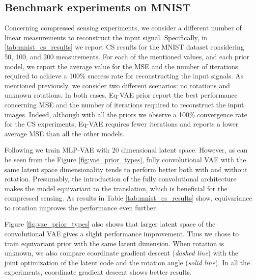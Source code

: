 \subsection{Benchmark experiments on MNIST}
Concerning compressed sensing experiments, we consider a different number of linear measurements to reconstruct the input signal. Specifically, in \autoref{tab:mnist_cs_results} we report CS results for the MNIST dataset considering 50, 100, and 200 measurements. For each of the mentioned values, and each prior model, we report the average value for the MSE and the number of iterations required to achieve a 100\% success rate for reconstructing the input signals.
As mentioned previously, we consider two different scenarios: no rotations and unknown rotations. In both cases, Eq-VAE prior report the best performance concerning MSE and the number of iterations required to reconstruct the input images.
Indeed, although with all the priors we observe a 100\% convergence rate for the CS experiments, Eq-VAE requires fewer iterations and reports a lower average MSE than all the other models.

Following \cite{Bora2017-as} we train MLP-VAE with 20 dimensional latent space. However, as can be seen from the Figure \ref{fig:vae_prior_types}, fully convolutional VAE with the same latent space dimensionality tends to perform better both with and without rotation. Presumably, the introduction of the fully convolutional architecture makes the model equivariant to the translation, which is beneficial for the compressed sensing. As results in Table \ref{tab:mnist_cs_results} show, equivariance to rotation improves the performance even further. 

Figure \ref{fig:vae_prior_types} also shows that larger latent space of the convolutional VAE gives a slight performance improvement. Thus we chose to train equivariant prior with the same latent dimension. When rotation is unknown, we also compare coordinate gradient descent (\textit{dashed line}) with the joint optimization of the latent code and the rotation angle (\textit{solid line}). In all the experiments, coordinate gradient descent shows better results.




